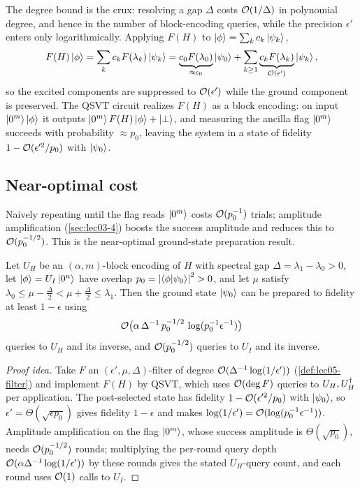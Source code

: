 The degree bound is the crux: resolving a gap $\Delta$ costs $\mathcal{O}(1/\Delta)$ in
polynomial degree, and hence in the number of block-encoding queries, while the
precision $\epsilon'$ enters only logarithmically. Applying $F(H)$ to
$\ket{\phi}=\sum_k c_k\ket{\psi_k}$,
\[
  F(H)\ket{\phi}=\sum_k c_k F(\lambda_k)\ket{\psi_k}
   =\underbrace{c_0 F(\lambda_0)}_{\approx c_0}\ket{\psi_0}
    +\sum_{k\ge1}\underbrace{c_k F(\lambda_k)}_{\mathcal{O}(\epsilon')}\ket{\psi_k},
\]
so the excited components are suppressed to $\mathcal{O}(\epsilon')$ while the ground
component is preserved. The QSVT circuit realizes $F(H)$ as a block encoding: on
input $\ket{0^m}\ket{\phi}$ it outputs $\ket{0^m}F(H)\ket{\phi}+\ket{\perp}$, and
measuring the ancilla flag $\ket{0^m}$ succeeds with probability
$\approx p_0$, leaving the system in a state of fidelity $1-\mathcal{O}(\epsilon'^2/p_0)$
with $\ket{\psi_0}$.

\subsection*{Near-optimal cost}

Naively repeating until the flag reads $\ket{0^m}$ costs $\mathcal{O}(p_0^{-1})$ trials;
amplitude amplification (\cref{sec:lec03-4}) boosts the success amplitude and
reduces this to $\mathcal{O}(p_0^{-1/2})$. This is the near-optimal ground-state
preparation result.

\begin{theorem}
\label{thm:lec05-gsp}
Let $U_H$ be an $(\alpha,m)$-block encoding of $H$ with spectral gap
$\Delta=\lambda_1-\lambda_0>0$, let $\ket{\phi}=U_I\ket{0^n}$ have overlap
$p_0=\left\lvert \braket{\phi|\psi_0} \right\rvert^2>0$, and let $\mu$ satisfy
$\lambda_0\le\mu-\tfrac{\Delta}{2}<\mu+\tfrac{\Delta}{2}\le\lambda_1$. Then the
ground state $\ket{\psi_0}$ can be prepared to fidelity at least $1-\epsilon$ using
\[
  \mathcal{O}\bigl(\alpha\,\Delta^{-1}\,p_0^{-1/2}\,\log(p_0^{-1}\epsilon^{-1})\bigr)
\]
queries to $U_H$ and its inverse, and $\mathcal{O}(p_0^{-1/2})$ queries to $U_I$ and its
inverse.
\end{theorem}

\begin{proof}[Proof idea]
Take $F$ an $(\epsilon',\mu,\Delta)$-filter of degree
$\mathcal{O}(\Delta^{-1}\log(1/\epsilon'))$ (\cref{def:lec05-filter}) and implement
$F(H)$ by QSVT, which uses $\mathcal{O}(\deg F)$ queries to $U_H,U_H^{\dagger}$ per application.
The post-selected state has fidelity $1-\mathcal{O}(\epsilon'^2/p_0)$ with
$\ket{\psi_0}$, so $\epsilon'=\Theta(\sqrt{\epsilon p_0})$ gives fidelity
$1-\epsilon$ and makes $\log(1/\epsilon')=\mathcal{O}(\log(p_0^{-1}\epsilon^{-1}))$.
Amplitude amplification on the flag $\ket{0^m}$, whose success amplitude is
$\Theta(\sqrt{p_0})$, needs $\mathcal{O}(p_0^{-1/2})$ rounds; multiplying the per-round
query depth $\mathcal{O}(\alpha\Delta^{-1}\log(1/\epsilon'))$ by these rounds gives the
stated $U_H$-query count, and each round uses $\mathcal{O}(1)$ calls to $U_I$.
\end{proof}

